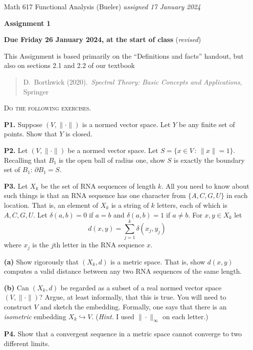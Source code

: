 \documentclass[12pt]{amsart}
\newcommand{\prob}[1]{\bigskip\noindent\textbf{#1.}\quad }
\newcommand{\epart}[1]{\medskip\noindent\textbf{(#1)}\quad }
\begin{document}
\scriptsize \noindent Math 617 Functional Analysis (Bueler) \hfill \emph{assigned 17 January 2024}
\normalsize\medskip

\Large\centerline{\textbf{Assignment 1}}
\large
\medskip

\centerline{\textbf{Due Friday 26 January 2024, at the start of class} (\emph{revised})}
\medskip
\normalsize

\thispagestyle{empty}

\bigskip
\noindent This Assignment is based primarily on the ``Definitions and facts'' handout, but also on sections 2.1 and 2.2 of our textbook

\begin{quote}
D.~Borthwick (2020).~\emph{Spectral Theory: Basic Concepts and Applications}, Springer
\end{quote}

\medskip
\noindent \textsc{Do the following exercises.}
\smallskip


\prob{P1}  Suppose $(V,\|\cdot\|)$ is a normed vector space.  Let $Y$ be any finite set of points.  Show that $Y$ is closed.

\prob{P2}  Let $(V,\|\cdot\|)$ be a normed vector space.  Let $S=\{x\in V\,:\,\|x\|=1\}$.  Recalling that $B_1$ is the open ball of radius one, show $S$ is exactly the boundary set of $B_1$: $\partial B_1=S$.

\prob{P3}  Let $X_k$ be the set of RNA sequences of length $k$.  All you need to know about such things is that an RNA sequence has one character from $\{A,C,G,U\}$ in each location.  That is, an element of $X_k$ is a string of $k$ letters, each of which is $A,C,G,U$.  Let $\delta(a,b)=0$ if $a=b$ and $\delta(a,b)=1$ if $a\ne b$.  For $x,y \in X_k$ let
	$$d(x,y) = \sum_{j=1}^k \delta(x_j,y_j)$$
where $x_j$ is the $j$th letter in the RNA sequence $x$.

\epart{a}  Show rigorously that $(X_k,d)$ is a metric space.  That is, show $d(x,y)$ computes a valid distance between any two RNA sequences of the same length.

\epart{b}  Can $(X_k,d)$ be regarded as a subset of a real normed vector space $(V,\|\cdot\|)$?  Argue, at least informally, that this is true.  You will need to construct $V$ and sketch the embedding.  Formally, one says that there is an \emph{isometric} embedding $X_k \hookrightarrow V$.  (\emph{Hint.}  I used $\|\cdot\|_\infty$ on each letter.)

\prob{P4}  Show that a convergent sequence in a metric space cannot converge to two different limits.
\end{document}
